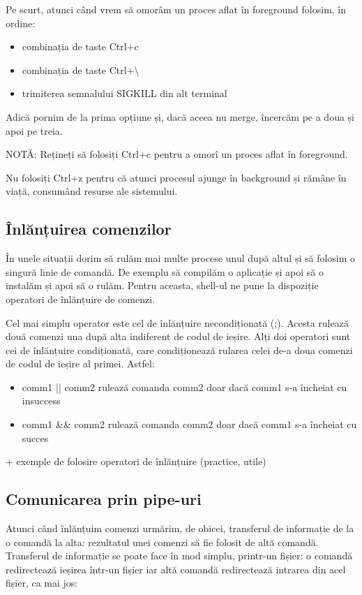 Pe scurt, atunci când vrem să omorâm un proces aflat în foreground folosim, în
ordine:

\begin{itemize}
	\item combinația de taste Ctrl+c
	\item combinația de taste Ctrl+\textbackslash{}
	\item trimiterea semnalului SIGKILL din alt terminal
\end{itemize}

Adică pornim de la prima opțiune și, dacă aceea nu merge, încercăm pe a doua și
apoi pe treia.

NOTĂ: Rețineți să folosiți Ctrl+c pentru a omorî un proces aflat în foreground.

Nu folosiți Ctrl+z pentru că atunci procesul ajunge în background și rămâne în
viață, consumând resurse ale sistemului.

\subsection{Înlănțuirea comenzilor}

În unele situații dorim să rulăm mai multe procese unul după altul și să folosim
o singură linie de comandă. De exemplu să compilăm o aplicație și apoi să o
instalăm și apoi să o rulăm. Pentru aceasta, shell-ul ne pune la dispoziție
operatori de înlănțuire de comenzi.

Cel mai simplu operator este cel de înlănțuire necondiționată (;). Acesta
rulează două comenzi una după alta indiferent de codul de ieșire. Alți doi
operatori sunt cei de înlănțuire condiționată, care condiționează rularea celei
de-a doua comenzi de codul de ieșire al primei. Astfel:

\begin{itemize}
	\item comm1 || comm2 rulează comanda comm2 doar dacă comm1 s-a încheiat cu insuccess
	\item comm1 \&\& comm2 rulează comanda comm2 doar dacă comm1 s-a încheiat cu succes
\end{itemize}

+ exemple de folosire operatori de înlănțuire (practice, utile)

\subsection{Comunicarea prin pipe-uri}

Atunci când înlănțuim comenzi urmărim, de obicei, transferul de informație de la
o comandă la alta: rezultatul unei comenzi să fie folosit de altă comandă.
Transferul de informație se poate face în mod simplu, printr-un fișier: o
comandă redirectează ieșirea într-un fișier iar altă comandă redirectează
intrarea din acel fișier, ca mai jos:

